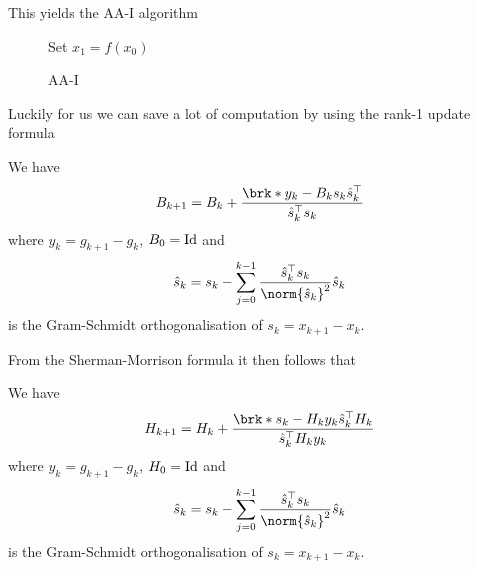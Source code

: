 \begin{frame}
	This yields the AA-I algorithm
	\begin{figure}
	\begin{algorithm}[H]
	\caption{AA-I}
	\color{gray}
	\BlankLine
	Set $x_1=f(x_0)$
	
	\end{algorithm}
	\end{figure}
\end{frame}

\begin{frame}
	Luckily for us we can save a lot of computation by using the rank-1 update formula
	\begin{proposition}
		We have
		\begin{align*}
			B_{k+1} = B_k+\frac{\brk*{y_k-B_ks_k}\hs_k^\top}{\hs_k^\top s_k}
		\end{align*}
		where $y_k = g_{k+1}-g_k$, $B_0=\operatorname{Id}$ and
		\begin{align*}
			\hs_k = s_k-\sum_{j=0}^{k-1}\frac{\hs_k^\top s_k}{\norm{\hs_k}^2}\hs_k
		\end{align*}
		is the Gram-Schmidt orthogonalisation of $s_k=x_{k+1}-x_k$.
	\end{proposition}
\end{frame}

\begin{frame}
	From the Sherman-Morrison formula it then follows that
	\begin{proposition}
		We have
		\begin{align*}
			H_{k+1} = H_k+\frac{\brk*{s_k-H_ky_k}\hs_k^\top H_k}{\hs_k^\top H_ky_k}
		\end{align*}
		where $y_k = g_{k+1}-g_k$, $H_0=\operatorname{Id}$ and
		\begin{align*}
			\hs_k = s_k-\sum_{j=0}^{k-1}\frac{\hs_k^\top s_k}{\norm{\hs_k}^2}\hs_k
		\end{align*}
		is the Gram-Schmidt orthogonalisation of $s_k=x_{k+1}-x_k$.
	\end{proposition}
\end{frame}

